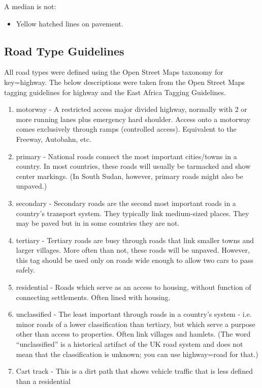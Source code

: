 \documentclass{article}
\begin{document}
A median is not:
\begin{itemize}
	\item Yellow hatched lines on pavement.  
\end{itemize}


\subsection{Road Type Guidelines}

All road types were defined using the Open Street Maps taxonomy for key=highway. The below descriptions were taken from the Open Street Maps tagging guidelines for highway and the East Africa Tagging Guidelines.  
\begin{enumerate}
	\item  motorway - A restricted access major divided highway, normally with 2 or more running lanes plus emergency hard shoulder. Access onto a motorway comes exclusively through ramps (controlled access).  Equivalent to the Freeway, Autobahn, etc.
	\item primary - National roads connect the most important cities/towns in a country. In most countries, these roads will usually be tarmacked and show center markings. (In South Sudan, however, primary roads might also be unpaved.)
	\item secondary - Secondary roads are the second most important roads in a country's transport system. They typically link medium-sized places. They may be paved but in in some countries they are not.
	\item tertiary - Tertiary roads are busy through roads that link smaller towns and larger villages. More often than not, these roads will be unpaved. However, this tag should be used only on roads wide enough to allow two cars to pass safely.
	\item residential - Roads which serve as an access to housing, without function of connecting settlements. Often lined with housing.
	\item unclassified - The least important through roads in a country's system - i.e. minor roads of a lower classification than tertiary, but which serve a purpose other than access to properties. Often link villages and hamlets. (The word ``unclassified'' is a historical artifact of the UK road system and does not mean that the classification is unknown; you can use highway=road for that.)
	\item Cart track - This is a dirt path that shows vehicle traffic that is less defined than a residential   
\end{enumerate}
	
\end{document}
